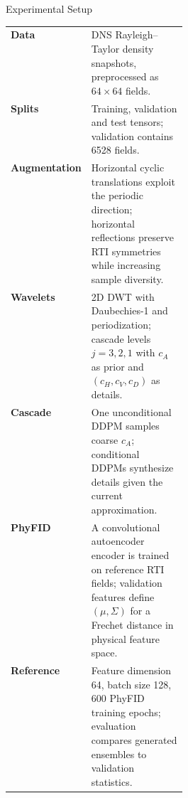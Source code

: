 \documentclass{article}
\newcommand{\PosterSmallSize}{21pt}
\newcommand{\PosterSmallLeading}{25pt}
\newcommand{\smallbody}{\fontsize{\PosterSmallSize}{\PosterSmallLeading}\selectfont}
\begin{document}
\begin{minipage}[t]{0.37\linewidth}
\begin{posterbox}[height=240mm,valign=top]{Experimental Setup}
  \smallbody
  \begin{tabularx}{\linewidth}{>{\bfseries}p{0.29\linewidth}X}
    Data & DNS Rayleigh--Taylor density snapshots, preprocessed as $64\times64$ fields. \\
    Splits & Training, validation and test tensors; validation contains 6528 fields. \\
    Augmentation & Horizontal cyclic translations exploit the periodic direction; horizontal reflections preserve RTI symmetries while increasing sample diversity. \\
    Wavelets & 2D DWT with Daubechies-1 and periodization; cascade levels $j=3,2,1$ with $c_A$ as prior and $(c_H,c_V,c_D)$ as details. \\
    Cascade & One unconditional DDPM samples coarse $c_A$; conditional DDPMs synthesize details given the current approximation. \\
    PhyFID & A convolutional autoencoder encoder is trained on reference RTI fields; validation features define $(\mu,\Sigma)$ for a Frechet distance in physical feature space. \\
    Reference & Feature dimension 64, batch size 128, 600 PhyFID training epochs; evaluation compares generated ensembles to validation statistics. \\
  \end{tabularx}
\end{posterbox}
\end{minipage}
\hfill
\end{document}
